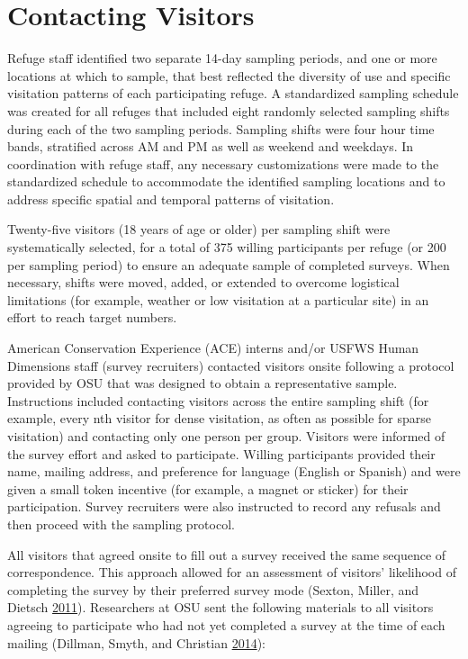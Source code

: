 \documentclass[]{book}
\begin{document}
\section{Contacting Visitors}\label{contacting-visitors}

Refuge staff identified two separate 14-day sampling periods, and one or
more locations at which to sample, that best reflected the diversity of
use and specific visitation patterns of each participating refuge. A
standardized sampling schedule was created for all refuges that included
eight randomly selected sampling shifts during each of the two sampling
periods. Sampling shifts were four hour time bands, stratified across AM
and PM as well as weekend and weekdays. In coordination with refuge
staff, any necessary customizations were made to the standardized
schedule to accommodate the identified sampling locations and to address
specific spatial and temporal patterns of visitation.

Twenty-five visitors (18 years of age or older) per sampling shift were
systematically selected, for a total of 375 willing participants per
refuge (or 200 per sampling period) to ensure an adequate sample of
completed surveys. When necessary, shifts were moved, added, or extended
to overcome logistical limitations (for example, weather or low
visitation at a particular site) in an effort to reach target numbers.

American Conservation Experience (ACE) interns and/or USFWS Human
Dimensions staff (survey recruiters) contacted visitors onsite following
a protocol provided by OSU that was designed to obtain a representative
sample. Instructions included contacting visitors across the entire
sampling shift (for example, every nth visitor for dense visitation, as
often as possible for sparse visitation) and contacting only one person
per group. Visitors were informed of the survey effort and asked to
participate. Willing participants provided their name, mailing address,
and preference for language (English or Spanish) and were given a small
token incentive (for example, a magnet or sticker) for their
participation. Survey recruiters were also instructed to record any
refusals and then proceed with the sampling protocol.

All visitors that agreed onsite to fill out a survey received the same
sequence of correspondence. This approach allowed for an assessment of
visitors' likelihood of completing the survey by their preferred survey
mode (Sexton, Miller, and Dietsch
\protect\hyperlink{ref-sexton2011}{2011}). Researchers at OSU sent the
following materials to all visitors agreeing to participate who had not
yet completed a survey at the time of each mailing (Dillman, Smyth, and
Christian \protect\hyperlink{ref-dillman2014}{2014}):
\end{document}
